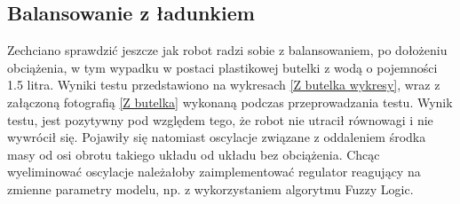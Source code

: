 \subsection{Balansowanie z ładunkiem}

Zechciano sprawdzić jeszcze jak robot radzi sobie z balansowaniem, po dołożeniu obciążenia, w tym wypadku w postaci plastikowej butelki z wodą o pojemności 1.5 litra. Wyniki testu przedstawiono na wykresach \ref{Z butelka wykresy}, wraz z załączoną fotografią \ref{Z butelka} wykonaną podczas przeprowadzania testu. Wynik testu, jest pozytywny pod względem tego, że robot nie utracił równowagi i nie wywrócił się. Pojawiły się natomiast oscylacje związane z oddaleniem środka masy od osi obrotu takiego układu od układu bez obciążenia. Chcąc wyeliminować oscylacje należałoby zaimplementować regulator reagujący na zmienne parametry modelu, np. z wykorzystaniem algorytmu Fuzzy Logic.

